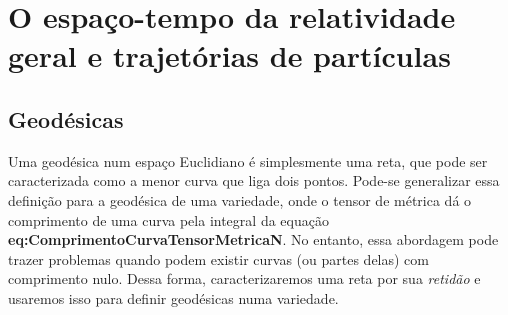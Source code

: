 \chapter{O espaço-tempo da relatividade geral e trajetórias de partículas}\label{cap:EspacoTempoRelatividadeGeralTrajetoriaParticulas}
\section{Geodésicas}\label{sec:Geodesicas}
Uma geodésica num espaço Euclidiano é simplesmente uma reta, que pode ser caracterizada como a menor curva que liga dois pontos. Pode-se generalizar essa definição para a geodésica de uma variedade, onde o tensor de métrica 
dá o comprimento de uma curva pela integral da equação \textbf{eq:ComprimentoCurvaTensorMetricaN}. No entanto, essa abordagem pode trazer problemas quando podem existir curvas (ou partes delas) com comprimento nulo. Dessa forma, caracterizaremos uma reta por sua \textit{retidão} e usaremos isso para definir geodésicas numa variedade.

